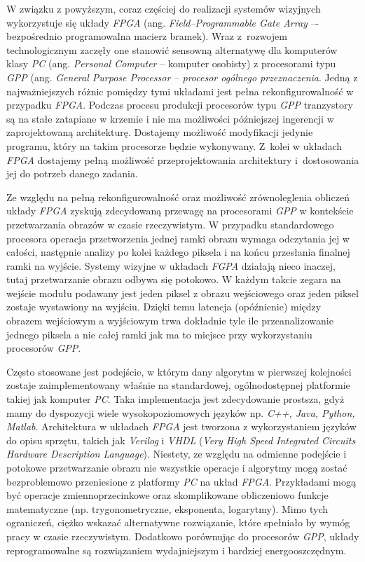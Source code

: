 W związku z powyższym, coraz częściej do realizacji systemów wizyjnych wykorzystuje się układy \textit{FPGA} (ang. \textit{Field--Programmable Gate Array} –- bezpośrednio programowalna macierz bramek). Wraz z~rozwojem technologicznym zaczęły one stanowić sensowną alternatywę dla komputerów klasy \textit{PC} (ang. \textit{Personal Computer} -- komputer osobisty) z procesorami typu \textit{GPP} (ang. \textit{General Purpose Processor -- procesor ogólnego przeznaczenia}. Jedną z najważniejszych różnic pomiędzy tymi układami jest pełna rekonfigurowalność w przypadku \textit{FPGA}. Podczas procesu produkcji procesorów typu \textit{GPP} tranzystory są na stałe zatapiane w krzemie i nie ma możliwości późniejszej ingerencji w zaprojektowaną architekturę. Dostajemy możliwość modyfikacji jedynie programu, który na takim procesorze będzie wykonywany. Z~kolei w układach \textit{FPGA} dostajemy pełną możliwość przeprojektowania architektury i~dostosowania jej do potrzeb danego zadania. 

Ze względu na pełną rekonfigurowalność oraz możliwość zrównoleglenia obliczeń układy \textit{FPGA} zyskują zdecydowaną przewagę na procesorami \textit{GPP} w kontekście przetwarzania obrazów w czasie rzeczywistym. W przypadku standardowego procesora operacja przetworzenia jednej ramki obrazu wymaga odczytania jej w całości, następnie analizy po kolei każdego piksela i na końcu przesłania finalnej ramki na wyjście. Systemy wizyjne w układach \textit{FGPA} działają nieco inaczej, tutaj przetwarzanie obrazu odbywa się potokowo. W każdym takcie zegara na wejście modułu podawany jest jeden piksel z obrazu wejściowego oraz jeden piksel zostaje wystawiony na wyjściu. Dzięki temu latencja (opóźnienie) między obrazem wejściowym a wyjściowym trwa dokładnie tyle ile przeanalizowanie jednego piksela a nie całej ramki jak ma to miejsce przy wykorzystaniu procesorów \textit{GPP}.

Często stosowane jest podejście, w którym dany algorytm w pierwszej kolejności zostaje zaimplementowany właśnie na standardowej, ogólnodostępnej platformie takiej jak komputer \textit{PC}. Taka implementacja jest zdecydowanie prostsza, gdyż mamy do dyspozycji wiele wysokopoziomowych języków np. \textit{C++, Java, Python, Matlab}. Architektura w układach \textit{FPGA} jest tworzona z wykorzystaniem języków do opisu sprzętu, takich jak \textit{Verilog} i \textit{VHDL} (\textit{Very High Speed Integrated Circuits Hardware Description Language}). Niestety, ze względu na odmienne podejście i potokowe przetwarzanie obrazu nie wszystkie operacje i algorytmy mogą zostać bezproblemowo przeniesione z platformy \textit{PC} na układ \textit{FPGA}. Przykładami mogą być operacje zmiennoprzecinkowe oraz skomplikowane obliczeniowo funkcje matematyczne (np. trygonometryczne, eksponenta, logarytmy). Mimo tych ograniczeń, ciężko wskazać alternatywne rozwiązanie, które spełniało by wymóg pracy w czasie rzeczywistym. Dodatkowo porównując do procesorów \textit{GPP}, układy reprogramowalne są rozwiązaniem wydajniejszym i bardziej energooszczędnym.

